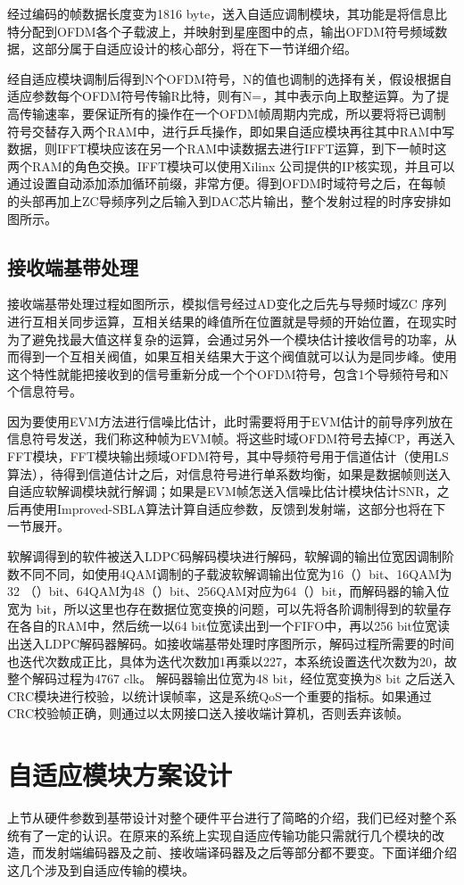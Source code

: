 经过编码的帧数据长度变为1816 byte，送入自适应调制模块，其功能是将信息比特分配到OFDM各个子载波上，并映射到星座图中的点，输出OFDM符号频域数据，这部分属于自适应设计的核心部分，将在下一节详细介绍。

经自适应模块调制后得到N个OFDM符号，N的值也调制的选择有关，假设根据自适应参数每个OFDM符号传输R比特，则有N=，其中表示向上取整运算。为了提高传输速率，要保证所有的操作在一个OFDM帧周期内完成，所以要将将已调制符号交替存入两个RAM中，进行乒乓操作，即如果自适应模块再往其中RAM中写数据，则IFFT模块应该在另一个RAM中读数据去进行IFFT运算，到下一帧时这两个RAM的角色交换。IFFT模块可以使用Xilinx 公司提供的IP核实现，并且可以通过设置自动添加添加循环前缀，非常方便。得到OFDM时域符号之后，在每帧的头部再加上ZC导频序列之后输入到DAC芯片输出，整个发射过程的时序安排如图所示。
\subsection{接收端基带处理}
接收端基带处理过程如图所示，模拟信号经过AD变化之后先与导频时域ZC 序列进行互相关同步运算，互相关结果的峰值所在位置就是导频的开始位置，在现实时为了避免找最大值这样复杂的运算，会通过另外一个模块估计接收信号的功率，从而得到一个互相关阀值，如果互相关结果大于这个阀值就可以认为是同步峰。使用这个特性就能把接收到的信号重新分成一个个OFDM符号，包含1个导频符号和N个信息符号。

因为要使用EVM方法进行信噪比估计，此时需要将用于EVM估计的前导序列放在信息符号发送，我们称这种帧为EVM帧。将这些时域OFDM符号去掉CP，再送入FFT模块，FFT模块输出频域OFDM符号，其中导频符号用于信道估计（使用LS算法），待得到信道估计之后，对信息符号进行单系数均衡，如果是数据帧则送入自适应软解调模块就行解调；如果是EVM帧怎送入信噪比估计模块估计SNR，之后再使用Improved-SBLA算法计算自适应参数，反馈到发射端，这部分也将在下一节展开。

软解调得到的软件被送入LDPC码解码模块进行解码，软解调的输出位宽因调制阶数不同不同，如使用4QAM调制的子载波软解调输出位宽为16（）bit、16QAM为32 （）bit、64QAM为48（）bit、256QAM对应为64（）bit，而解码器的输入位宽为 bit，所以这里也存在数据位宽变换的问题，可以先将各阶调制得到的软量存在各自的RAM中，然后统一以64 bit位宽读出到一个FIFO中，再以256 bit位宽读出送入LDPC解码器解码。如接收端基带处理时序图所示，解码过程所需要的时间也迭代次数成正比，具体为迭代次数加1再乘以227，本系统设置迭代次数为20，故整个解码过程为4767 clk。 解码器输出位宽为48 bit，经位宽变换为8 bit 之后送入CRC模块进行校验，以统计误帧率，这是系统QoS一个重要的指标。如果通过CRC校验帧正确，则通过以太网接口送入接收端计算机，否则丢弃该帧。


\section{自适应模块方案设计}
上节从硬件参数到基带设计对整个硬件平台进行了简略的介绍，我们已经对整个系统有了一定的认识。在原来的系统上实现自适应传输功能只需就行几个模块的改造，而发射端编码器及之前、接收端译码器及之后等部分都不要变。下面详细介绍这几个涉及到自适应传输的模块。

